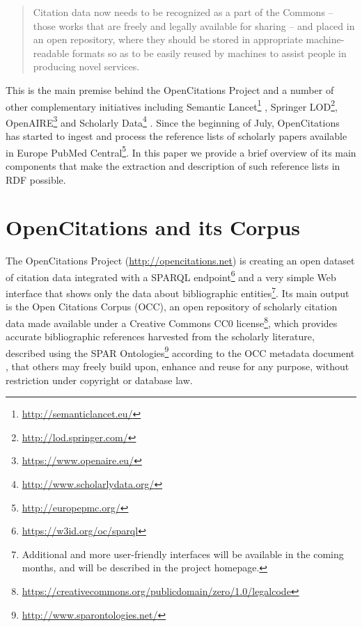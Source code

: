 \documentclass[runningheads,a4paper]{llncs}
\begin{document}
\begin{quote}
Citation data now needs to be recognized as a part of the Commons -- those works that are freely and legally available for sharing -- and placed in an open repository, where they should be stored in appropriate machine-readable formats so as to be easily reused by machines to assist people in producing novel services.
\end{quote}

This is the main premise behind the OpenCitations Project and a number of other complementary initiatives including Semantic Lancet\footnote{\url{http://semanticlancet.eu/}} \cite{__RefNumPara__69_1852566440}, Springer LOD\footnote{\url{http://lod.springer.com/}}, OpenAIRE\footnote{\url{https://www.openaire.eu/}} \cite{__RefNumPara__71_1852566440} and Scholarly Data\footnote{\url{http://www.scholarlydata.org/}} \cite{__RefNumPara__75_1852566440}. Since the beginning of July, OpenCitations has started to ingest and process the reference lists of scholarly papers available in Europe PubMed Central\footnote{\url{http://europepmc.org/}}. In this paper we provide a brief overview of its main components that make the extraction and description of such reference lists in RDF possible.

\section{OpenCitations and its Corpus}

The OpenCitations Project (\url{http://opencitations.net}) is creating an open dataset of citation data integrated with a SPARQL endpoint\footnote{\url{https://w3id.org/oc/sparql}} and a very simple Web interface that shows only the data about bibliographic entities\footnote{Additional and more user-friendly interfaces will be available in the coming months, and will be described in the project homepage.}. Its main output is the Open Citations Corpus (OCC), an open repository of scholarly citation data made available under a Creative Commons CC0 license\footnote{\url{https://creativecommons.org/publicdomain/zero/1.0/legalcode}}, which provides accurate bibliographic references harvested from the scholarly literature, described using the SPAR Ontologies\footnote{\url{http://www.sparontologies.net/}} \cite{__RefNumPara__17_1852566440} according to the OCC metadata document  \cite{__RefNumPara__19_1852566440}, that others may freely build upon, enhance and reuse for any purpose, without restriction under copyright or database law.
\end{document}
